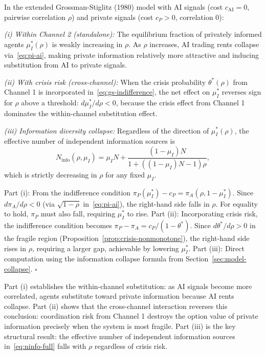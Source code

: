 \begin{proposition}\label{prop:info-diversity}
  In the extended Grossman-Stiglitz (1980) model with AI signals (cost $c_{\text{AI}} = 0$, pairwise correlation $\rho$) and private signals (cost $c_P > 0$, correlation 0):

  \emph{(i) Within Channel 2 (standalone):} The equilibrium fraction of privately informed agents $\mu_I^*(\rho)$ is weakly increasing in $\rho$. As $\rho$ increases, AI trading rents collapse via~\eqref{eq:pi-ai}, making private information relatively more attractive and inducing substitution from AI to private signals.

  \emph{(ii) With crisis risk (cross-channel):} When the crisis probability $\theta^*(\rho)$ from Channel 1 is incorporated in~\eqref{eq:gs-indifference}, the net effect on $\mu_I^*$ reverses sign for $\rho$ above a threshold: $d\mu_I^*/d\rho < 0$, because the crisis effect from Channel 1 dominates the within-channel substitution effect.

  \emph{(iii) Information diversity collapse:} Regardless of the direction of $\mu_I^*(\rho)$, the effective number of independent information sources is
  \begin{equation}\label{eq:ninfo-full}
    N_{\text{info}}(\rho, \mu_I) = \mu_I N + \frac{(1-\mu_I) N}{1 + ((1-\mu_I)N-1)\rho},
  \end{equation}
  which is strictly decreasing in $\rho$ for any fixed $\mu_I$.

   Part (i): From the indifference condition $\pi_P(\mu_I^*) - c_P = \pi_A(\rho, 1-\mu_I^*)$. Since $d\pi_A/d\rho < 0$ (via $\sqrt{1-\rho}$ in~\eqref{eq:pi-ai}), the right-hand side falls in $\rho$. For equality to hold, $\pi_P$ must also fall, requiring $\mu_I^*$ to rise. Part (ii): Incorporating crisis risk, the indifference condition becomes $\pi_P - \pi_A = c_P/(1-\theta^*)$. Since $d\theta^*/d\rho > 0$ in the fragile region (Proposition~\ref{prop:crisis-nonmonotone}), the right-hand side rises in $\rho$, requiring a larger gap, achievable by lowering $\mu_I^*$. Part (iii): Direct computation using the information collapse formula from Section~\ref{sec:model-collapse}. $\square$
\end{proposition}

Part (i) establishes the within-channel substitution: as AI signals become more correlated, agents substitute toward private information because AI rents collapse. Part (ii) shows that the cross-channel interaction reverses this conclusion: coordination risk from Channel 1 destroys the option value of private information precisely when the system is most fragile. Part (iii) is the key structural result: the effective number of independent information sources in~\eqref{eq:ninfo-full} falls with $\rho$ regardless of crisis risk.

